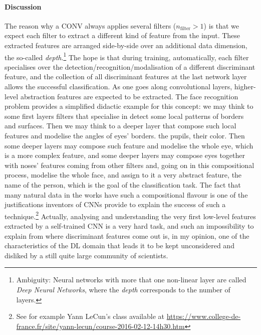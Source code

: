 \paragraph*{Discussion}
The reason why a CONV always applies several filters (\ie $n_{\text{filter}}>1$) is
that we expect each filter to extract a different kind of feature from
the input. These extracted features are arranged
side-by-side over an additional data dimension, the so-called
\emph{depth}.\footnote{Ambiguity: Neural networks with more that one non-linear layer are called
\emph{Deep Neural Networks}, where the \emph{depth} corresponds to the number of
layers.} The hope is that during training, automatically, each filter specialises over the detection/recognition/modalisation of a different discriminant feature, and the collection of all discriminant features at the last network layer allows the successful classification.  As one goes along convolutional layers, higher-level abstraction
features are expected to be extracted.  The face recognition problem provides a simplified didactic example for this concept: we may think to some first layers filters that specialise in detect some local patterns of borders and surfaces. Then we may think to a deeper layer that compose such local features and modelise the angles of eyes' borders. the pupils, their color. Then some deeper layers may compose such feature and modelise  the whole eye, which is a more complex feature, and some deeper layers may compose eyes together with noses' features coming from other filters and, going on in this compositional process, modelise the whole face, and assign to it a very abstract feature, \ie the name of the person, which is the goal of the classification task. The fact that many natural data in the works have such a compositional flavour is one of the justifications inventors of CNNs provide to explain the success of such a technique.\footnote{See for example Yann LeCun's class available at \url{https://www.college-de-france.fr/site/yann-lecun/course-2016-02-12-14h30.htm}}  Actually, analysing and understanding the very first low-level features extracted by a self-trained CNN is a very hard task, and such an impossibility to explain from where discriminant features come out is, in my opinion, one of the characteristics of the DL domain that leads it to be kept unconsidered and disliked by a still quite large community of scientists. 

